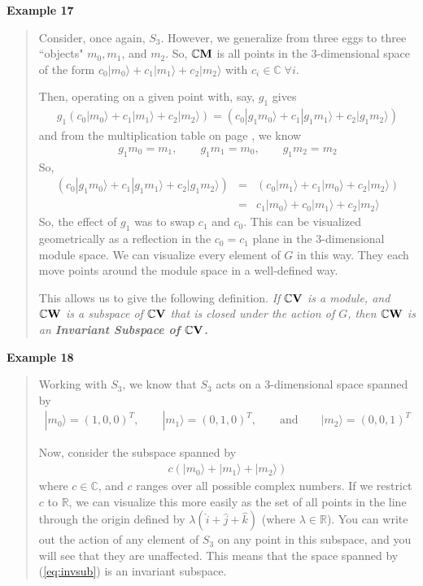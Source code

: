 \documentclass[12pt,epsf]{article}
\def\nolabel{\nonumber }
\def\nolabel{\nonumber }
\begin{document}
\bf Example 17 \rm
\vspace*{-2ex}
\begin{quote}
Consider, once again, $S_3$.	However, we generalize
from three eggs to three ``objects" $m_0,m_1$, and $m_2$.  So,
$\mathbb{C}\bf M\rm$ is all points in the 3-dimensional space of the
form $c_0|m_0\rangle + c_1|m_1\rangle + c_2 |m_2 \rangle$ with $c_i \in
\mathbb{C} \; \forall i$.  

Then, operating on a given point with, say, $g_1$ gives
\begin{eqnarray}
g_1 (c_0|m_0\rangle + c_1 |m_1\rangle + c_2 |m_2\rangle ) =
(c_0|g_1m_0\rangle + c_1|g_1m_1\rangle + c_2|g_1m_2\rangle)\nolabel 
\end{eqnarray}
and from the multiplication table on page \pageref{s3}, we know
\begin{eqnarray}
g_1m_0 = m_1, \qquad g_1m_1 = m_0, \qquad g_1m_2 = m_2\nolabel 
\end{eqnarray}
So, 
\begin{eqnarray}
(c_0|g_1m_0\rangle + c_1|g_1m_1\rangle + c_2|g_1m_2\rangle) &=&
(c_0|m_1\rangle + c_1|m_0\rangle + c_2|m_2\rangle) \nolabel \\
&=& c_1|m_0\rangle + c_0|m_1\rangle + c_2|m_2\rangle\nolabel 
\end{eqnarray}
So, the effect of $g_1$ was to swap $c_1$ and $c_0$.  This can be
visualized geometrically as a reflection in the $c_0 = c_1$ plane in
the 3-dimensional module space.  We can visualize every element of
$G$ in this way.  They each move points around the module space in a
well-defined way.  

This allows us to give the following definition.  \it If $\mathbb{C}\bf
V\it$ is a module, and $\mathbb{C}\bf W\it$ is a subspace of
$\mathbb{C}\bf V\it$ that is closed under the action of $G$, then
$\mathbb{C}\bf W\it$ is an \bf Invariant Subspace \it of $\mathbb{C}\bf
V\it$. \rm
\end{quote}

\bf Example 18 \rm
\vspace*{-2ex}
\begin{quote}
Working with $S_3$, we know that $S_3$ acts on a
3-dimensional space spanned by 
\begin{eqnarray}
|m_0\rangle = (1,0,0)^T, \qquad |m_1\rangle = (0, 1, 0 )^T, \qquad \mbox{and}
\qquad |m_2\rangle = (0, 0, 1)^T \nolabel 
\end{eqnarray}

Now, consider the subspace spanned by 
\begin{eqnarray}
c(|m_0\rangle + |m_1\rangle + |m_2\rangle) \label{eq:invsub}
\end{eqnarray}
where $c\in \mathbb{C}$, and $c$ ranges over all possible complex
numbers.  If we restrict $c$ to $\mathbb{R}$, we can visualize this
more easily as the set of all points in the line through the origin
defined by $\lambda(\hat i + \hat j + \hat k)$ (where $\lambda \in
\mathbb{R}$).  You can write out the action of any element of $S_3$ on
any point in this subspace, and you will see that they are unaffected. 
This means that the space spanned by (\ref{eq:invsub}) is an invariant
subspace.  
\end{quote}
\end{document}
